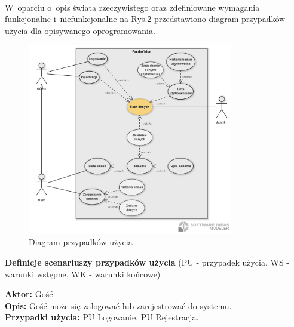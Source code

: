 \documentclass[12pt, letterpaper]{article}
\begin{document}
\paragraph{}		
W~oparciu o~opis świata rzeczywistego oraz zdefiniowane wymagania funkcjonalne i~niefunkcjonalne na Rys.2 przedstawiono diagram przypadków użycia dla opisywanego oprogramowania.

\begin{figure}[h]
  \centering
      \includegraphics[width=0.8\textwidth]{useCaseDiagram}
  \caption{Diagram przypadków użycia}
\end{figure}			
		
		

		\newpage		
		
		\textbf{Definicje scenariuszy przypadków użycia} (PU - przypadek użycia, WS - warunki wstępne, WK - warunki końcowe)\\
		
		\quad		
		
		\textbf{Aktor:} Gość\\
		
		\textbf{Opis:} Gość może się zalogować lub zarejestrować do systemu.\\
		
		\textbf{Przypadki użycia:} PU Logowanie, PU Rejestracja.
		
		\vspace{1cm}
		
\end{document}

